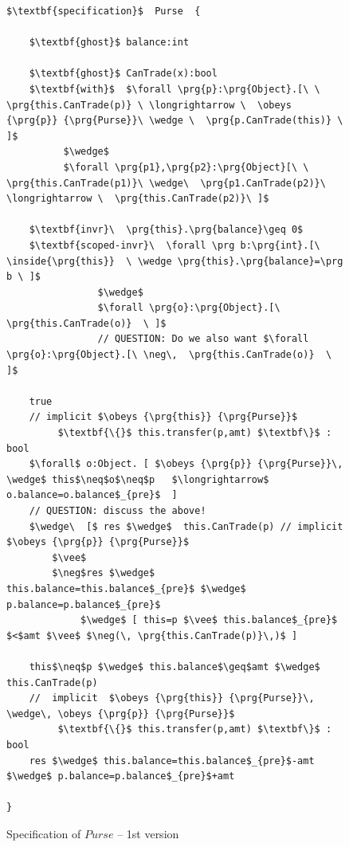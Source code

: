 \begin{figure}[t]
\begin{lstlisting}[mathescape=true, language=Chainmail, frame=lines]
$\textbf{specification}$  Purse  {
    
    $\textbf{ghost}$ balance:int
    
    $\textbf{ghost}$ CanTrade(x):bool  
    $\textbf{with}$  $\forall \prg{p}:\prg{Object}.[\ \ \prg{this.CanTrade(p)} \ \longrightarrow \  \obeys {\prg{p}} {\prg{Purse}}\ \wedge \  \prg{p.CanTrade(this)} \  ]$
          $\wedge$   
          $\forall \prg{p1},\prg{p2}:\prg{Object}[\ \ \prg{this.CanTrade(p1)}\ \wedge\  \prg{p1.CanTrade(p2)}\ \longrightarrow \  \prg{this.CanTrade(p2)}\ ]$  
                   
    $\textbf{invr}\  \prg{this}.\prg{balance}\geq 0$  
    $\textbf{scoped-invr}\  \forall \prg b:\prg{int}.[\ \inside{\prg{this}}  \ \wedge \prg{this}.\prg{balance}=\prg b \ ]$ 
                $\wedge$
                $\forall \prg{o}:\prg{Object}.[\  \prg{this.CanTrade(o)}  \ ]$       
                // QUESTION: Do we also want $\forall \prg{o}:\prg{Object}.[\ \neg\,  \prg{this.CanTrade(o)}  \ ]$
      
    true  
    // implicit $\obeys {\prg{this}} {\prg{Purse}}$
         $\textbf{\{}$ this.transfer(p,amt) $\textbf\}$ : bool
    $\forall$ o:Object. [ $\obeys {\prg{p}} {\prg{Purse}}\, \wedge$ this$\neq$o$\neq$p   $\longrightarrow$  o.balance=o.balance$_{pre}$  ]
    // QUESTION: discuss the above!
    $\wedge\  [$ res $\wedge$  this.CanTrade(p) // implicit $\obeys {\prg{p}} {\prg{Purse}}$
        $\vee$
        $\neg$res $\wedge$ this.balance=this.balance$_{pre}$ $\wedge$ p.balance=p.balance$_{pre}$
             $\wedge$ [ this=p $\vee$ this.balance$_{pre}$ $<$amt $\vee$ $\neg(\, \prg{this.CanTrade(p)}\,)$ ]

    this$\neq$p $\wedge$ this.balance$\geq$amt $\wedge$  this.CanTrade(p)  
    //  implicit  $\obeys {\prg{this}} {\prg{Purse}}\, \wedge\, \obeys {\prg{p}} {\prg{Purse}}$
         $\textbf{\{}$ this.transfer(p,amt) $\textbf\}$ : bool
    res $\wedge$ this.balance=this.balance$_{pre}$-amt $\wedge$ p.balance=p.balance$_{pre}$+amt 

}

\end{lstlisting}
\caption{Specification of  $Purse$ -- 1st version}
\label{fig:PurseSpec}
 \end{figure}
 
